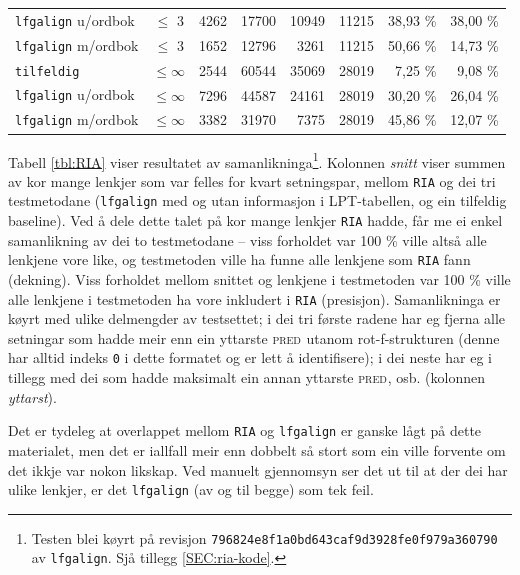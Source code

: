 \documentclass[12pt,a4paper,oneside,draft]{report}
\newcommand{\F}[2]{\textsc{#1}\ensuremath{_{#2}}}
\newcommand{\PRED}{\F{pred}{}}
\begin{document}
\begin{table}[htb]
\begin{center}
\begin{tabular}{lcrrrrrr}
 \texttt{lfgalign} u/ordbok  &  $\leq$ 3       &   4262  &  17700  &    10949  &                 11215  &  38,93 \%           &  38,00 \%              \\
 \texttt{lfgalign} m/ordbok  &  $\leq$ 3       &   1652  &  12796  &     3261  &                 11215  &  50,66 \%           &  14,73 \%              \\
\hline
 \texttt{tilfeldig}          &  $\leq \infty$  &   2544  &  60544  &    35069  &                 28019  &  7,25 \%            &  9,08 \%               \\
 \texttt{lfgalign} u/ordbok  &  $\leq \infty$  &   7296  &  44587  &    24161  &                 28019  &  30,20 \%           &  26,04 \%              \\
 \texttt{lfgalign} m/ordbok  &  $\leq \infty$  &   3382  &  31970  &     7375  &                 28019  &  45,86 \%           &  12,07 \%              \\
\end{tabular}
\end{center}
\end{table}


Tabell \ref{tbl:RIA} viser resultatet av
 samanlikninga\footnote{Testen blei køyrt på revisjon
        \texttt{796824e8f1a0bd643caf9d3928fe0f979a360790} av \texttt{lfgalign}.  Sjå
        tillegg \ref{SEC:ria-kode}. }. Kolonnen \emph{snitt} viser summen av kor mange
 lenkjer som var felles for kvart setningspar, mellom \texttt{RIA} og dei tri
 testmetodane (\texttt{lfgalign} med og utan informasjon i LPT-tabellen, og
 ein tilfeldig baseline). Ved å dele dette talet på kor mange lenkjer
 \texttt{RIA} hadde, får me ei enkel samanlikning av dei to testmetodane --
 viss forholdet var 100 \% ville altså alle lenkjene vore like, og
 testmetoden ville ha funne alle lenkjene som \texttt{RIA} fann
 (dekning). Viss forholdet mellom snittet og lenkjene i testmetoden
 var 100 \% ville alle lenkjene i testmetoden ha vore inkludert i \texttt{RIA}
 (presisjon). Samanlikninga er køyrt med ulike delmengder av
 testsettet; i dei tri første radene har eg fjerna alle setningar som
 hadde meir enn ein yttarste \PRED{} utanom rot-f\hyp{}strukturen (denne
 har alltid indeks \texttt{0} i dette formatet og er lett å identifisere); i
 dei neste har eg i tillegg med dei som hadde maksimalt ein annan
 yttarste \PRED{}, osb. (kolonnen \emph{yttarst}).

Det er tydeleg at overlappet mellom \texttt{RIA} og \texttt{lfgalign} er ganske lågt
 på dette materialet, men det er iallfall meir enn dobbelt så stort
 som ein ville forvente om det ikkje var nokon likskap. Ved manuelt
 gjennomsyn ser det ut til at der dei har ulike lenkjer, er det
 \texttt{lfgalign} (av og til begge) som tek feil.
\end{document}
